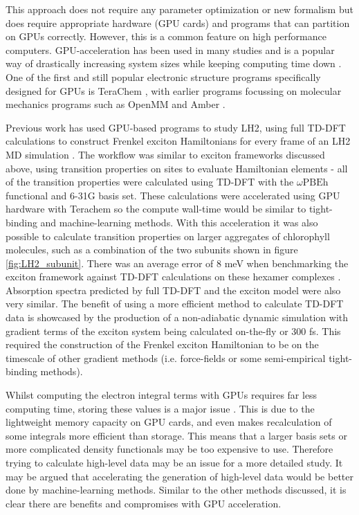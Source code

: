 This approach does not require any parameter optimization or new formalism but does
require appropriate hardware (GPU cards) and programs that can partition on GPUs
correctly. However, this is a common feature on high performance computers. GPU-acceleration
has been used in many studies and is a popular way of drastically increasing system 
sizes while keeping computing time down \cite{Seritan2021}. One of the first and 
still popular electronic structure programs specifically designed for GPUs is TeraChem
\cite{Seritan2020}, with earlier programs focussing on molecular mechanics programs 
such as OpenMM \cite{Eastman2017} and Amber \cite{Salomon-Ferrer2013}.

Previous work has used GPU-based programs to study LH2, using full TD-DFT calculations
to construct Frenkel exciton Hamiltonians for every frame of an LH2 MD simulation \cite{Sisto2014a, Sisto2017}.
The workflow was similar to exciton frameworks discussed above, using transition
properties on sites to evaluate Hamiltonian elements - all of the transition properties
were calculated using TD-DFT with the $\omega\text{PBEh}$ functional and 6-31G basis
set. These calculations were accelerated using GPU hardware with Terachem so the
compute wall-time would be similar to tight-binding and machine-learning methods. 
With this acceleration it was also possible to calculate transition properties on
larger aggregates of chlorophyll molecules, such as a combination of the two subunits
shown in figure \ref{fig:LH2_subunit}. There was an average error of 8 meV when
benchmarking the exciton framework against TD-DFT calculations on these hexamer
complexes \cite{Sisto2014a}. Absorption spectra predicted by full TD-DFT and the
exciton model were also very similar. The benefit of using a more efficient method
to calculate TD-DFT data is showcased by the production of a non-adiabatic dynamic
simulation with gradient terms of the exciton system being calculated on-the-fly
or 300 fs. This required the construction of the Frenkel exciton Hamiltonian to
be on the timescale of other gradient methods (i.e. force-fields or some semi-empirical 
tight-binding methods).

Whilst computing the electron integral terms with GPUs requires far less computing 
time, storing these values is a major issue \cite{Sisto2014a}. This is due to the
lightweight memory capacity on GPU cards, and even makes recalculation of some integrals
more efficient than storage. This means that a larger basis sets or more complicated
density functionals may be too expensive to use. Therefore trying to calculate high-level
data may be an issue for a more detailed study. It may be argued that accelerating 
the generation of high-level data would be better done by machine-learning methods.
Similar to the other methods discussed, it is clear there are benefits and compromises
with GPU acceleration.

